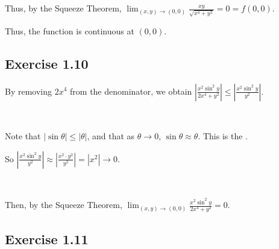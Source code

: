 \documentclass[11pt,fleqn]{book} %
\begin{document}
Thus, by the Squeeze Theorem, $\lim_{(x,y) \to (0,0)} \frac{xy}{\sqrt{x^4 + y^2}} = 0 = f(0, 0)$. 

Thus, the function is continuous at $(0, 0)$. 

\subsection*{Exercise 1.10}

By removing $2x^4$ from the denominator, we obtain $\left| \frac{x^2 \sin^2{y}}{2x^4 + y^2} \right| \le \left| \frac{x^2 \sin^2{y}}{y^2} \right|$. 

{~~~}

Note that $| \sin{\theta} | \le | \theta |$, and that as $\theta \to 0$, $\sin \theta \approx \theta$. This is the . 

\begin{center}
\end{center}

So $\left| \frac{x^2 \sin^2{y}}{y^2} \right| \approx \left| \frac{x^2 \cdot y^2}{y^2} \right| = \left| x^2 \right| \to 0$. 

{~~~}

Then, by the Squeeze Theorem, $\lim_{(x,y) \to (0,0)} \frac{x^2 \sin^2{y}}{2x^4 + y^2} = 0$. 

\subsection*{Exercise 1.11}
\end{document}
